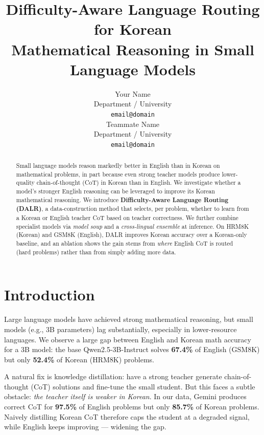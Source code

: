 \documentclass[11pt]{article}
\title{Difficulty-Aware Language Routing for Korean \\ Mathematical Reasoning in Small Language Models}
\author{Your Name \\
  Department / University \\
  \texttt{email@domain} \\\And
  Teammate Name \\
  Department / University \\
  \texttt{email@domain}}
\begin{document}
\maketitle

\begin{abstract}
Small language models reason markedly better in English than in Korean
on mathematical problems, in part because even strong teacher models
produce lower-quality chain-of-thought (CoT) in Korean than in English.
We investigate whether a model's stronger English reasoning can be
leveraged to improve its Korean mathematical reasoning. We introduce
\textbf{Difficulty-Aware Language Routing (DALR)}, a data-construction
method that selects, per problem, whether to learn from a Korean or
English teacher CoT based on teacher correctness. We further combine
specialist models via \emph{model soup} \citep{wortsman2022soup} and a
\emph{cross-lingual ensemble} at inference. On HRM8K (Korean) and GSM8K
(English), DALR improves Korean accuracy over a Korean-only baseline,
and an ablation shows the gain stems from \emph{where} English CoT is
routed (hard problems) rather than from simply adding more data.
\end{abstract}

\section{Introduction}
\label{sec:intro}

Large language models have achieved strong mathematical reasoning, but
small models (e.g., 3B parameters) lag substantially, especially in
lower-resource languages. We observe a large gap between English and
Korean math accuracy for a 3B model: the base Qwen2.5-3B-Instruct
solves \textbf{67.4\%} of English (GSM8K) but only \textbf{52.4\%} of
Korean (HRM8K) problems.

A natural fix is knowledge distillation: have a strong teacher generate
chain-of-thought (CoT) solutions and fine-tune the small student. But
this faces a subtle obstacle: \emph{the teacher itself is weaker in
Korean}. In our data, Gemini produces correct CoT for \textbf{97.5\%}
of English problems but only \textbf{85.7\%} of Korean problems. Naively
distilling Korean CoT therefore caps the student at a degraded signal,
while English keeps improving --- widening the gap.
\end{document}
